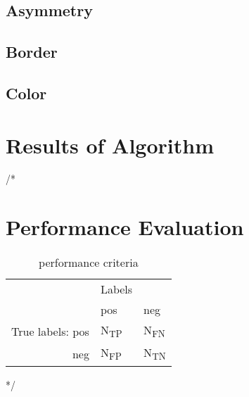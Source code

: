 \subsection{Asymmetry}


\subsection{Border}


\subsection{Color}





\section{Results of Algorithm}



/*

\section{Performance Evaluation}



\begin{table}[H]
\centering
\small
    \begin{tabular}{ | r | l | l  |}
    \hline
    & Labels & \\
    & pos & neg \\ \hline
    True labels: pos & N\textsubscript{TP} & N\textsubscript{FN} \\ \hline
    neg & N\textsubscript{FP} & N\textsubscript{TN} \\ \hline

    \end{tabular}

    \caption{performance criteria}
    \label{fig:tds_mod_eval}

\end{table}

*/